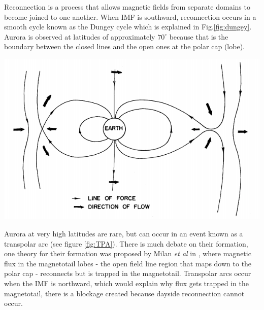\documentclass[12pt]{article}
\newenvironment{Figure}
  {\par\medskip\noindent\minipage{\linewidth}}
  {\endminipage\par\medskip}
\begin{document}
Reconnection is a process that allows magnetic fields from separate domains to become joined to one another. When IMF is southward, reconnection occurs in a smooth cycle known as the Dungey cycle \cite{dungeyCycle} which is explained in Fig.\ref{fig:dungey}. Aurora is observed at latitudes of approximately $70^{\circ}$ because that is the boundary between the closed lines and the open ones at the polar cap (lobe).

\begin{Figure}
    \centering
    \includegraphics[width=0.6\linewidth]{dungeyCycle.png}
    \label{fig:dungey}
\end{Figure}

Aurora at very high latitudes are rare, but can occur in an event known as a transpolar arc \cite{polarAurora1, polarAurora2} (see figure \ref{fig:TPA}). There is much debate on their formation, one theory for their formation was proposed by Milan \textit{et al} in \cite{TPAdebate}, where magnetic flux in the magnetotail lobes - the open field line region that maps down to the polar cap - reconnects but is trapped in the magnetotail. Transpolar arcs occur when the IMF is northward, which would explain why flux gets trapped in the magnetotail, there is a blockage created because dayside reconnection cannot occur.
\end{document}
